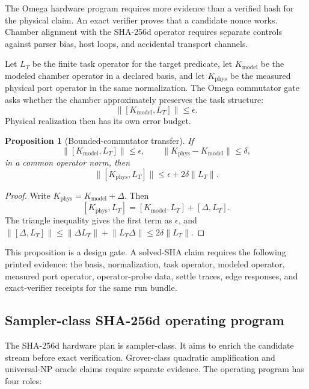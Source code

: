\documentclass[11pt]{article}
\newtheorem{proposition}[theorem]{Proposition}
\theoremstyle{definition}
\theoremstyle{remark}
\begin{document}
The Omega hardware program requires more evidence than a verified hash for the
physical claim. An exact verifier proves that a candidate nonce works. Chamber
alignment with the SHA-256d operator requires separate controls against parser
bias, host loops, and accidental transport channels.

Let \(L_T\) be the finite task operator for the target predicate, let
\(K_{\mathrm{model}}\) be the modeled chamber operator in a declared basis, and
let \(K_{\mathrm{phys}}\) be the measured physical port operator in the same
normalization. The Omega commutator gate asks whether the chamber approximately
preserves the task structure:
\[
\lVert [K_{\mathrm{model}},L_T]\rVert\le \epsilon .
\]
Physical realization then has its own error budget.

\begin{proposition}[Bounded-commutator transfer]
\label{prop:commutatortransfer}
If
\[
\lVert [K_{\mathrm{model}},L_T]\rVert\le \epsilon,\qquad
\lVert K_{\mathrm{phys}}-K_{\mathrm{model}}\rVert\le \delta,
\]
in a common operator norm, then
\[
\lVert [K_{\mathrm{phys}},L_T]\rVert
\le
\epsilon+2\delta\lVert L_T\rVert .
\]
\end{proposition}

\begin{proof}
Write \(K_{\mathrm{phys}}=K_{\mathrm{model}}+\Delta\). Then
\[
[K_{\mathrm{phys}},L_T]=[K_{\mathrm{model}},L_T]+[\Delta,L_T].
\]
The triangle inequality gives the first term as \(\epsilon\), and
\(\lVert[\Delta,L_T]\rVert\le
\lVert\Delta L_T\rVert+\lVert L_T\Delta\rVert
\le 2\delta\lVert L_T\rVert\).
\end{proof}

This proposition is a design gate. A solved-SHA claim requires the following
printed evidence: the
basis, normalization, task operator, modeled operator, measured port operator,
operator-probe data, settle traces, edge responses, and exact-verifier
receipts for the same run bundle.

\subsection{Sampler-class SHA-256d operating program}

The SHA-256d hardware plan is sampler-class. It aims to enrich the candidate
stream before exact verification. Grover-class quadratic amplification and
universal-NP oracle claims require separate evidence. The operating program has
four roles:
\end{document}
